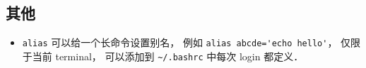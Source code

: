 \subsection{其他}
\begin{itemize}
\item \verb`alias` 可以给一个长命令设置别名， 例如 \verb|alias abcde='echo hello'|， 仅限于当前 terminal， 可以添加到 \verb|~/.bashrc| 中每次 login 都定义．
\end{itemize}

